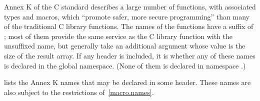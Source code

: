 \pnum
Annex K of the C standard describes a large number of functions,
with associated types and macros,
which ``promote safer, more secure programming''
than many of the traditional C library functions.
The names of the functions have a suffix of ;
most of them provide the same service
as the C library function with the unsuffixed name,
but generally take an additional argument
whose value is the size of the result array.
If any \Cpp{} header is included,
it is 
whether any of these names
is declared in the global namespace.
(None of them is declared in namespace .)

\pnum
{} lists the Annex K names
that may be declared in some header.
These names are also subject to the restrictions of~\ref{macro.names}.

